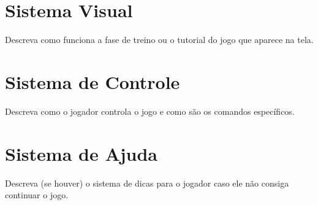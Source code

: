 
\section{Sistema Visual}

Descreva como funciona a fase de treino ou o tutorial do jogo que aparece na tela.


\section{Sistema de Controle}

Descreva como o jogador controla o jogo e como são os comandos específicos.

\section{Sistema de Ajuda}

Descreva (se houver) o sistema de dicas para o jogador caso ele não consiga continuar o jogo.